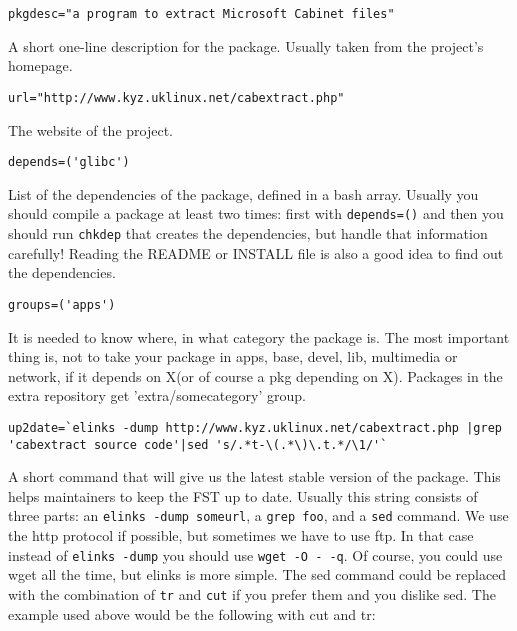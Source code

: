 \begin{verbatim}
pkgdesc="a program to extract Microsoft Cabinet files"
\end{verbatim}

A short one-line description for the package. Usually taken from the project's homepage.

\begin{verbatim}
url="http://www.kyz.uklinux.net/cabextract.php"
\end{verbatim}

The website of the project.

\begin{verbatim}
depends=('glibc')
\end{verbatim}

List of the dependencies of the package, defined in a bash array. Usually you should compile a package at least two times: first with {\tt depends=()} and then you should run {\tt chkdep} that creates the dependencies, but handle that information carefully! Reading the README or INSTALL file is also a good idea to find out the dependencies.

\begin{verbatim}
groups=('apps')
\end{verbatim}

It is needed to know where, in what category the package is. The most important thing is, not to take your package in apps, base, devel, lib, multimedia or network, if it depends on X(or of course a pkg depending on X).
Packages in the extra repository get 'extra/somecategory' group.

\begin{verbatim}
up2date=`elinks -dump http://www.kyz.uklinux.net/cabextract.php |grep 'cabextract source code'|sed 's/.*t-\(.*\)\.t.*/\1/'`
\end{verbatim}

A short command that will give us the latest stable version of the package. This helps maintainers to keep the FST up to date. Usually this string consists of three parts: an {\tt elinks -dump someurl}, a {\tt grep foo}, and a {\tt sed} command. We use the http protocol if possible, but sometimes we have to use ftp. In that case instead of {\tt elinks -dump} you should use {\tt wget -O - -q}. Of course, you could use wget all the time, but elinks is more simple. The sed command could be replaced with the combination of {\tt tr} and {\tt cut} if you prefer them and you dislike sed. The example used above would be the following with cut and tr:

